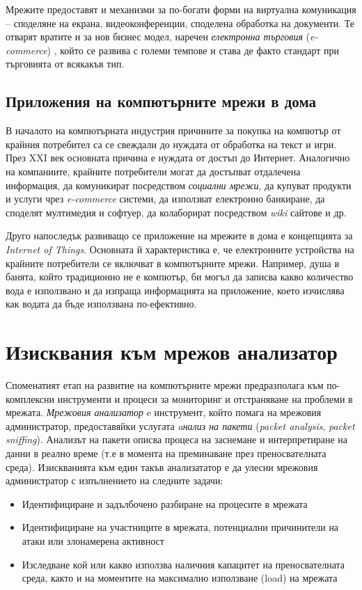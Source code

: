 \documentclass[12pt,a4paper,oneside]{book}
\begin{document}
Мрежите предоставят и механизми за по-богати форми на виртуална комуникация --
споделяне на екрана, видеоконференции, споделена обработка на документи.
Те отварят вратите и за нов бизнес модел, наречен \textit{електронна
търговия} (\textit{e-commerce}) \cite{tanenbaum_computer_2011}, който се
развива с големи темпове и става де факто стандарт при търговията от всякакъв тип.
\subsection{Приложения на компютърните мрежи в дома}

В началото на компютърната индустрия причините за покупка на компютър от крайния
потребител са се свеждали до нуждата от обработка на текст и игри. През XXI век
основната причина е нуждата от достъп до
Интернет. Аналогично на компаниите, крайните потребители могат да достъпват
отдалечена информация, да комуникират посредством \textit{социални мрежи},
да купуват продукти и услуги чрез \textit{e-commerce} системи, да използват електронно
банкиране, да споделят мултимедия и софтуер, да колаборират посредством
\textit{wiki} сайтове и др.

Друго напоследък развиващо се приложение на мрежите в дома е концепцията за
\textit{Internet of Things}. Основната й характеристика е, че електронните
устройства на крайните потребители се включват в компютърните мрежи. Например,
душа в банята, който традиционно не е компютър, би могъл да записва какво количество
вода е използвано и да изпраща информацията на приложение, което изчислява как
водата да бъде използвана по-ефективно.

\section{Изисквания към мрежов анализатор}

Споменатият етап на развитие на компютърните мрежи предразполага към
по-комплексни инструменти и процеси за мониторинг и отстраняване на проблеми в
мрежата. \textit{Мрежовия анализатор}
e инструмент, който помага на мрежовия администратор, предоставяйки услугата
\textit{aнализ на пакети} (\textit{packet analysis}, \textit{packet sniffing}).
Анализът на пакети описва процеса на заснемане и интерпретиране на данни в
реално време (т.е в момента на преминаване през преносвателната среда).
Изискванията към един такъв анализататор е да улесни мрежовия администратор
с изпълнението на следните задачи:

\begin{itemize}
  \item
  Идентифициране и задълбочено разбиране на процесите в мрежата
\item
  Идентифициране на участниците в мрежата, потенциални причинители на атаки или
  злонамерена активност
\item
  Изследване кой или какво използва наличния капацитет на преносвателната
  среда, както и на моментите на максимално използване (load) на мрежата
\end{itemize}
\end{document}
